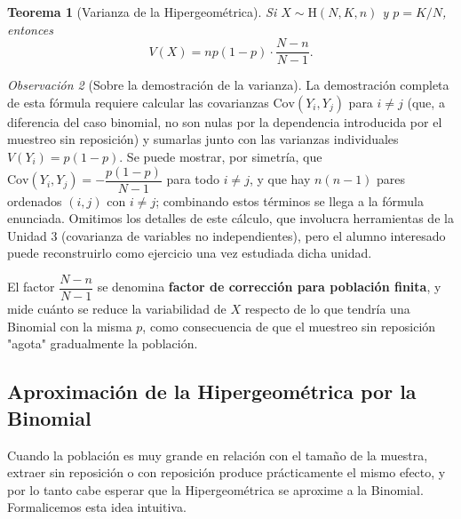 \documentclass[11pt,a4paper]{article}
\theoremstyle{plain}
\newtheorem{teorema}{Teorema}[section]
\theoremstyle{definition}
\theoremstyle{remark}
\newtheorem{observacion}[teorema]{Observación}
\begin{document}
\begin{teorema}[Varianza de la Hipergeométrica]
Si $X\sim\text{H}(N,K,n)$ y $p=K/N$, entonces
$$V(X)=np(1-p)\cdot\frac{N-n}{N-1}.$$
\end{teorema}

\begin{observacion}[Sobre la demostración de la varianza]
La demostración completa de esta fórmula requiere calcular las covarianzas $\text{Cov}(Y_i,Y_j)$ para $i\ne j$ (que, a diferencia del caso binomial, no son nulas por la dependencia introducida por el muestreo sin reposición) y sumarlas junto con las varianzas individuales $V(Y_i)=p(1-p)$. Se puede mostrar, por simetría, que $\text{Cov}(Y_i,Y_j)=-\dfrac{p(1-p)}{N-1}$ para todo $i\ne j$, y que hay $n(n-1)$ pares ordenados $(i,j)$ con $i\ne j$; combinando estos términos se llega a la fórmula enunciada. Omitimos los detalles de este cálculo, que involucra herramientas de la Unidad 3 (covarianza de variables no independientes), pero el alumno interesado puede reconstruirlo como ejercicio una vez estudiada dicha unidad.
\end{observacion}

El factor $\dfrac{N-n}{N-1}$ se denomina \textbf{factor de corrección para población finita}, y mide cuánto se reduce la variabilidad de $X$ respecto de lo que tendría una Binomial con la misma $p$, como consecuencia de que el muestreo sin reposición "agota" gradualmente la población.

\subsection{Aproximación de la Hipergeométrica por la Binomial}

Cuando la población es muy grande en relación con el tamaño de la muestra, extraer sin reposición o con reposición produce prácticamente el mismo efecto, y por lo tanto cabe esperar que la Hipergeométrica se aproxime a la Binomial. Formalicemos esta idea intuitiva.
\end{document}
